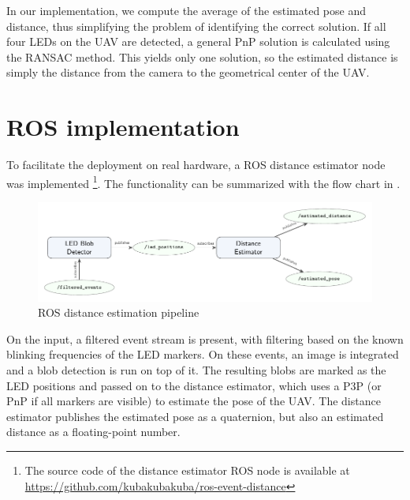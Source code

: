 In our implementation, we compute the average of the estimated pose and distance, thus simplifying the problem of identifying the correct solution. If all four \ac{LED}s on the \ac{UAV} are detected, a general \ac{PnP} solution is calculated using the \ac{RANSAC} method. This yields only one solution, so the
estimated distance is simply the distance from the camera to the geometrical center of the \ac{UAV}.

\section{ROS implementation}
To facilitate the deployment on real hardware, a ROS distance estimator node was implemented
\footnote{The source code of the distance estimator ROS node is available at \url{https://github.com/kubakubakuba/ros-event-distance}}.
The functionality can be summarized with the flow chart 
in
.
\begin{figure}[H]
	\centering
	\includegraphics[width=1.0\textwidth]{./fig/tikz/rosflow.pdf}
	\caption{ROS distance estimation pipeline}
	\label{fig:rosflow}
\end{figure}
On the input, a filtered event stream is present, with filtering based on the known blinking frequencies of the \ac{LED} markers.
On these events, an image is integrated and a blob detection is run on top of it. The resulting blobs are marked as the \ac{LED} positions and passed 
on to the distance estimator, which uses a P3P (or PnP if all markers are visible) to estimate the pose of the \ac{UAV}. The distance estimator 
publishes the estimated pose as a quaternion, but also an estimated distance as a floating-point number.